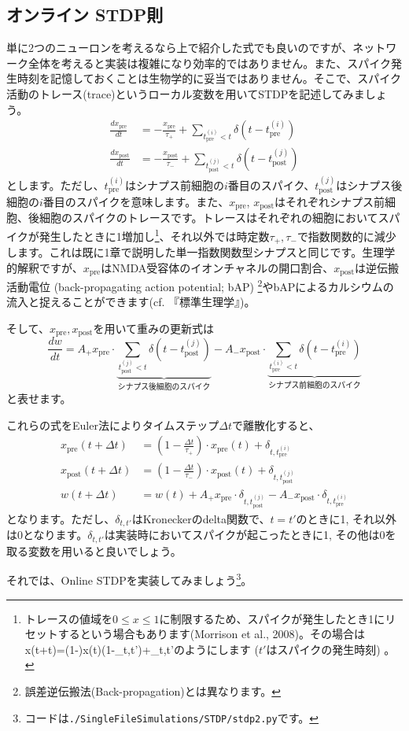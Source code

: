 \subsection{オンライン STDP則}
単に2つのニューロンを考えるなら上で紹介した式でも良いのですが、ネットワーク全体を考えると実装は複雑になり効率的ではありません。また、スパイク発生時刻を記憶しておくことは生物学的に妥当ではありません。そこで、スパイク活動のトレース(trace)というローカル変数を用いてSTDPを記述してみましょう。
\begin{align}
\frac{dx_\text{pre}}{dt}&=-\frac{x_\text{pre}}{\tau_+}+\sum_{t_{\text{pre}}^{(i)} <t} \delta \left(t-t_{\text{pre}}^{(i)}\right)\\
\frac{dx_\text{post}}{dt}&=-\frac{x_\text{post}}{\tau_-}+\sum_{t_{\text{post}}^{(j)}<t} \delta \left(t-t_{\text{post}}^{(j)}\right)
\end{align}
とします。ただし、$t_{\text{pre}}^{(i)}$はシナプス前細胞の$i$番目のスパイク、$t_{\text{post}}^{(j)}$はシナプス後細胞の$i$番目のスパイクを意味します。また、$x_\text{pre}$, $x_\text{post}$はそれぞれシナプス前細胞、後細胞のスパイクのトレースです。トレースはそれぞれの細胞においてスパイクが発生したときに1増加し\footnote{トレースの値域を$0\leq x\leq1$に制限するため、スパイクが発生したとき1にリセットするという場合もあります(Morrison et al., 2008)。その場合はx(t+\Delta t)=\left(1-\right)x(t)\cdot(1-\delta_{t,t'})+\delta_{t,t'}のようにします ($t'$はスパイクの発生時刻) 。}、それ以外では時定数$\tau_+, \tau_-$で指数関数的に減少します。これは既に1章で説明した単一指数関数型シナプスと同じです。生理学的解釈ですが、$x_\text{pre}$はNMDA受容体のイオンチャネルの開口割合、$x_\text{post}$は逆伝搬活動電位 (back-propagating action potential; bAP) \footnote{誤差逆伝搬法(Back-propagation)とは異なります。}やbAPによるカルシウムの流入と捉えることができます(cf. 『標準生理学』)。\par
そして、$x_\text{pre}, x_\text{post}$を用いて重みの更新式は
\begin{equation}
\frac{dw}{dt}=A_+ x_\text{pre} \cdot \underbrace{\sum_{t_{\text{post}}^{(j)}<t} \delta \left(t-t_{\text{post}}^{(j)}\right)}_{\text{シナプス後細胞のスパイク}} - A_- x_{\text{post}} \cdot \underbrace{\sum_{t_{\text{pre}}^{(i)} <t} \delta \left(t-t_{\text{pre}}^{(i)}\right)}_{\text{シナプス前細胞のスパイク}}
\end{equation}
と表せます。\par
これらの式をEuler法によりタイムステップ$\Delta t$で離散化すると、
\begin{align}
x_{\text{pre}}(t+\Delta t)&=\left(1-\frac{\Delta t}{\tau_{+}}\right)\cdot x_{\text{pre}}(t)+
\delta_{t,t_{\text{pre}}^{(i)}}\\
x_{\text{post}}(t+\Delta t)&=\left(1-\frac{\Delta t}{\tau_{-}}\right)\cdot x_{\text{post}}(t)+\delta_{t,t_{\text{post}}^{(j)}}\\
w(t+\Delta t)&=w(t)+A_+ x_{\text{pre}}\cdot \delta_{t,t_{\text{post}}^{(j)}} - A_-x_{\text{post}}\cdot \delta_{t,t_{\text{pre}}^{(i)}}
\end{align}
となります。ただし、$\delta_{t,t'}$はKroneckerのdelta関数で、$t=t'$のときに1, それ以外は0となります。$\delta_{t,t'}$は実装時においてスパイクが起こったときに1, その他は0を取る変数を用いると良いでしょう。\par
それでは、Online STDPを実装してみましょう\footnote{コードは\texttt{./SingleFileSimulations/STDP/stdp2.py}です。}。
